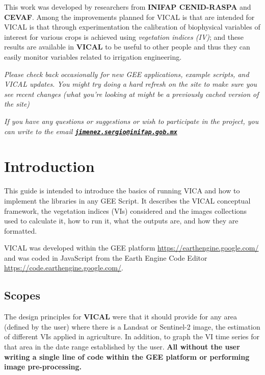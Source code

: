 \documentclass[
]{book}
\begin{document}
This work was developed by researchers from \textbf{INIFAP CENID-RASPA} and \textbf{CEVAF}. Among the improvements planned for VICAL is that are intended for VICAL is that through experimentation the calibration of biophysical variables of interest for various crops is achieved using \emph{vegetation indices (IV)}; and these results are available in \textbf{VICAL} to be useful to other people and thus they can easily monitor variables related to irrigation engineering.

\emph{Please check back occasionally for new GEE applications, example scripts, and VICAL updates. You might try doing a hard refresh on the site to make sure you see recent changes (what you're looking at might be a previously cached version of the site)}

\emph{If you have any questions or suggestions or wish to participate in the project, you can write to the email \textbf{\href{mailto:jimenez.sergio@inifap.gob.mx}{\nolinkurl{jimenez.sergio@inifap.gob.mx}}}}

\hypertarget{intro}{%
\chapter{Introduction}\label{intro}}

This guide is intended to introduce the basics of running VICA and how to implement the libraries in any GEE Script. It describes the VICAL conceptual framework, the vegetation indices (VIs) considered and the images collections used to calculate it, how to run it, what the outputs are, and how they are formatted.

VICAL was developed within the GEE platform \url{https://earthengine.google.com/} and was coded in JavaScript from the Earth Engine Code Editor \url{https://code.earthengine.google.com/}.

\hypertarget{scopes}{%
\section{Scopes}\label{scopes}}

The design principles for \textbf{VICAL} were that it should provide for any area (defined by the user) where there is a Landsat or Sentinel-2 image, the estimation of different VIs applied in agriculture. In addition, to graph the VI time series for that area in the date range established by the user. \textbf{All without the user writing a single line of code within the GEE platform or performing image pre-processing.}
\end{document}
